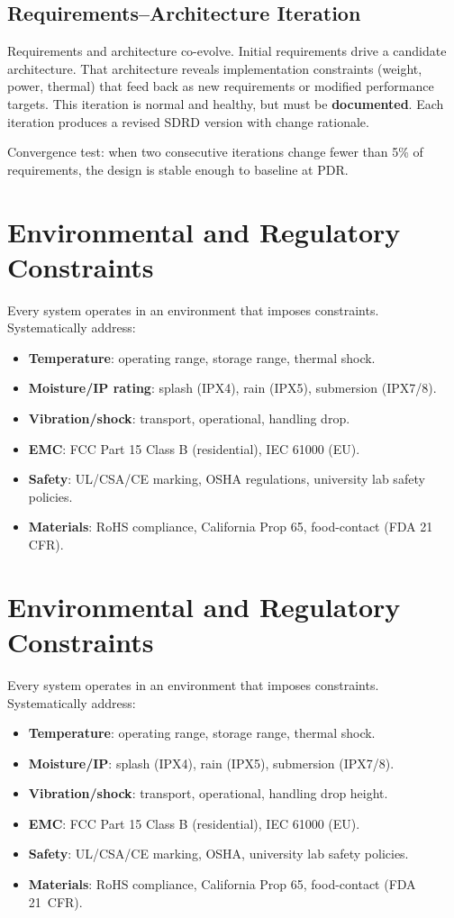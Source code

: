 \subsection{Requirements--Architecture Iteration}
Requirements and architecture co-evolve. Initial requirements drive a candidate architecture. That architecture reveals implementation constraints (weight, power, thermal) that feed back as new requirements or modified performance targets. This iteration is normal and healthy, but must be \textbf{documented}. Each iteration produces a revised SDRD version with change rationale.

Convergence test: when two consecutive iterations change fewer than 5\% of requirements, the design is stable enough to baseline at PDR.

\section{Environmental and Regulatory Constraints}
Every system operates in an environment that imposes constraints. Systematically address:
\begin{itemize}[nosep,leftmargin=1.5em]
\item \textbf{Temperature}: operating range, storage range, thermal shock.
\item \textbf{Moisture/IP rating}: splash (IPX4), rain (IPX5), submersion (IPX7/8).
\item \textbf{Vibration/shock}: transport, operational, handling drop.
\item \textbf{EMC}: FCC Part 15 Class B (residential), IEC 61000 (EU).
\item \textbf{Safety}: UL/CSA/CE marking, OSHA regulations, university lab safety policies.
\item \textbf{Materials}: RoHS compliance, California Prop 65, food-contact (FDA 21 CFR).
\end{itemize}


\section{Environmental and Regulatory Constraints}
Every system operates in an environment that imposes constraints. Systematically address:
\begin{itemize}[nosep,leftmargin=1.5em]
\item \textbf{Temperature}: operating range, storage range, thermal shock.
\item \textbf{Moisture/IP}: splash (IPX4), rain (IPX5), submersion (IPX7/8).
\item \textbf{Vibration/shock}: transport, operational, handling drop height.
\item \textbf{EMC}: FCC Part 15 Class B (residential), IEC 61000 (EU).
\item \textbf{Safety}: UL/CSA/CE marking, OSHA, university lab safety policies.
\item \textbf{Materials}: RoHS compliance, California Prop 65, food-contact (FDA 21~CFR).
\end{itemize}

